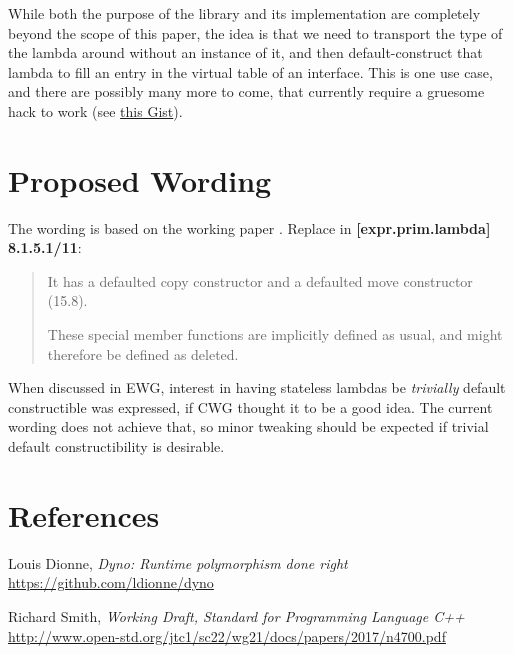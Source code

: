 \documentclass{wg21}
\begin{document}
While both the purpose of the library and its implementation are completely
beyond the scope of this paper, the idea is that we need to transport the
type of the lambda around without an instance of it, and then default-construct
that lambda to fill an entry in the virtual table of an interface. This is one
use case, and there are possibly many more to come, that currently require a
gruesome hack to work (see \href{https://github.com/ldionne/dyno/blob/03eaeded898225660787f03655edb89642a72e7c/include/dyno/detail/empty_object.hpp#L13}{this Gist}).


\section{Proposed Wording}
The wording is based on the working paper \cite{N4700}. Replace in
\textbf{[expr.prim.lambda] 8.1.5.1/11}:

\begin{quote}
  It has a defaulted copy constructor and a defaulted move constructor (15.8).
  \begin{note}
  These special member functions are implicitly defined as usual, and might
  therefore be defined as deleted.
  \end{note}
\end{quote}

When discussed in EWG, interest in having stateless lambdas be \textit{trivially}
default constructible was expressed, if CWG thought it to be a good idea. The
current wording does not achieve that, so minor tweaking should be expected if
trivial default constructibility is desirable.


\section{References}
\renewcommand{\section}[2]{}%
\begin{thebibliography}{9}

    Louis Dionne,
    \emph{Dyno: Runtime polymorphism done right}\newline
    \url{https://github.com/ldionne/dyno}

    Richard Smith,
    \emph{Working Draft, Standard for Programming Language C++}\newline
    \url{http://www.open-std.org/jtc1/sc22/wg21/docs/papers/2017/n4700.pdf}

\end{thebibliography}
\end{document}
